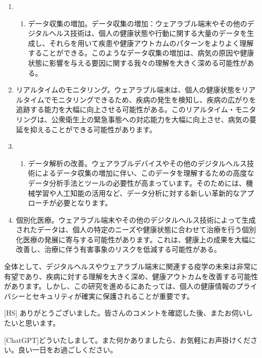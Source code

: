 \documentclass[
]{book}
\providecommand{\tightlist}{%
  \setlength{\itemsep}{0pt}\setlength{\parskip}{0pt}}
\theoremstyle{definition}
\theoremstyle{definition}
\theoremstyle{definition}
\theoremstyle{definition}
\theoremstyle{remark}
\begin{document}
\begin{enumerate}
\def\labelenumi{\arabic{enumi}.}
\item
  \begin{enumerate}
  \def\labelenumii{\arabic{enumii}.}
  \tightlist
  \item
    データ収集の増加。データ収集の増加：ウェアラブル端末やその他のデジタルヘルス技術は、個人の健康状態や行動に関する大量のデータを生成し、それらを用いて疾患や健康アウトカムのパターンをよりよく理解することができる。このようなデータ収集の増加は、病気の原因や健康状態に影響を与える要因に関する我々の理解を大きく深める可能性がある。
  \end{enumerate}
\item
  リアルタイムのモニタリング。ウェアラブル端末は、個人の健康状態をリアルタイムでモニタリングできるため、疾病の発生を検知し、疾病の広がりを追跡する能力を大幅に向上させる可能性がある。このリアルタイム・モニタリングは、公衆衛生上の緊急事態への対応能力を大幅に向上させ、病気の蔓延を抑えることができる可能性があります。
\item
  \begin{enumerate}
  \def\labelenumii{\arabic{enumii}.}
  \setcounter{enumii}{2}
  \tightlist
  \item
    データ解析の改善。ウェアラブルデバイスやその他のデジタルヘルス技術によるデータ収集の増加に伴い、このデータを理解するための高度なデータ分析手法とツールの必要性が高まっています。そのためには、機械学習や人工知能の活用など、データ分析に対する新しい革新的なアプローチが必要となります。
  \end{enumerate}
\item
  個別化医療。ウェアラブル端末やその他のデジタルヘルス技術によって生成されたデータは、個人の特定のニーズや健康状態に合わせて治療を行う個別化医療の発展に寄与する可能性があります。これは、健康上の成果を大幅に改善し、治療に伴う有害事象のリスクを低減する可能性がある。
\end{enumerate}

全体として、デジタルヘルスやウェアラブル端末に関連する疫学の未来は非常に有望であり、疾病に対する理解を大きく深め、健康アウトカムを改善する可能性があります。しかし、この研究を進めるにあたっては、個人の健康情報のプライバシーとセキュリティが確実に保護されることが重要です。

{[}HS{]} ありがとうございました。皆さんのコメントを確認した後、またお伺いしたいと思います。

{[}ChatGPT{]}どういたしまして。また何かありましたら、お気軽にお声掛けください。良い一日をお過ごしください。
\end{document}
